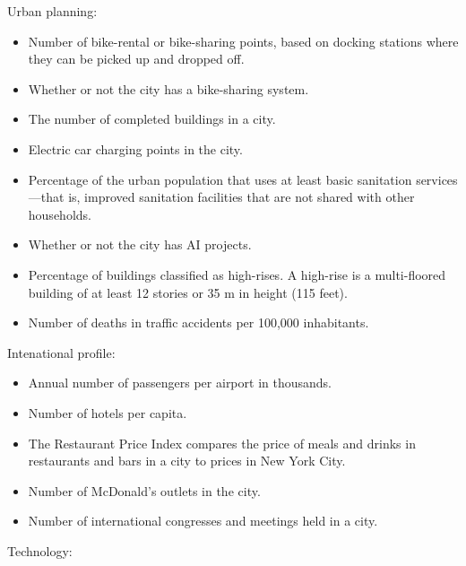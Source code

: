 \documentclass[
  english,
  12pt,
  a4paper,
]{scrartcl}
\providecommand{\tightlist}{%
  \setlength{\itemsep}{0pt}\setlength{\parskip}{0pt}}
\begin{document}
Urban planning:

\begin{itemize}
\tightlist
\item
  Number of bike-rental or bike-sharing points, based on docking
  stations where they can be picked up and dropped off.
\item
  Whether or not the city has a bike-sharing system.
\item
  The number of completed buildings in a city.
\item
  Electric car charging points in the city.
\item
  Percentage of the urban population that uses at least basic sanitation
  services---that is, improved sanitation facilities that are not shared
  with other households.
\item
  Whether or not the city has AI projects.
\item
  Percentage of buildings classified as high-rises. A high-rise is a
  multi-floored building of at least 12 stories or 35 m in height (115
  feet).
\item
  Number of deaths in traffic accidents per 100,000 inhabitants.
\end{itemize}

Intenational profile:

\begin{itemize}
\tightlist
\item
  Annual number of passengers per airport in thousands.
\item
  Number of hotels per capita.
\item
  The Restaurant Price Index compares the price of meals and drinks in
  restaurants and bars in a city to prices in New York City.
\item
  Number of McDonald's outlets in the city.
\item
  Number of international congresses and meetings held in a city.
\end{itemize}

Technology:
\end{document}
